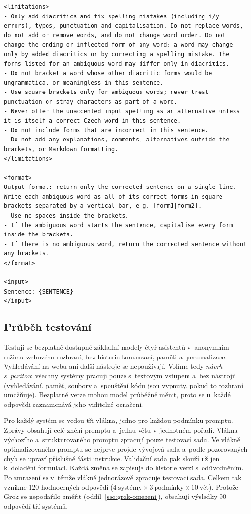 \documentclass[11pt,a4paper]{article}
\begin{document}
\begin{lstlisting}[style=prompt,caption={Strukturovaný prompt},label={lst:prompt-strukturovany}]
<limitations>
- Only add diacritics and fix spelling mistakes (including i/y errors), typos, punctuation and capitalisation. Do not replace words, do not add or remove words, and do not change word order. Do not change the ending or inflected form of any word; a word may change only by added diacritics or by correcting a spelling mistake. The forms listed for an ambiguous word may differ only in diacritics.
- Do not bracket a word whose other diacritic forms would be ungrammatical or meaningless in this sentence.
- Use square brackets only for ambiguous words; never treat punctuation or stray characters as part of a word.
- Never offer the unaccented input spelling as an alternative unless it is itself a correct Czech word in this sentence.
- Do not include forms that are incorrect in this sentence.
- Do not add any explanations, comments, alternatives outside the brackets, or Markdown formatting.
</limitations>

<format>
Output format: return only the corrected sentence on a single line. Write each ambiguous word as all of its correct forms in square brackets separated by a vertical bar, e.g. [form1|form2].
- Use no spaces inside the brackets.
- If the ambiguous word starts the sentence, capitalise every form inside the brackets.
- If there is no ambiguous word, return the corrected sentence without any brackets.
</format>

<input>
Sentence: {SENTENCE}
</input>
\end{lstlisting}

\subsection{Průběh testování}
\label{sec:prubeh}

Testují se bezplatně dostupné základní modely čtyř asistentů
v~anonymním režimu webového rozhraní, bez historie konverzací, paměti
a~personalizace. Vyhledávání na webu ani další nástroje se nepoužívají.
Volíme tedy \emph{návrh s~paritou}: všechny systémy pracují pouze
s~textovým vstupem a~bez nástrojů (vyhledávání, paměť, soubory
a~spouštění kódu jsou vypnuty, pokud to rozhraní umožňuje).
Bezplatné verze mohou model průběžně měnit, proto se u~každé odpovědi
zaznamenává jeho viditelné označení.

Pro každý systém se vedou tři vlákna, jedno pro každou podmínku promptu.
Zprávy obsahují celé znění promptu a~jednu větu v~jednotném pořadí.
Vlákna výchozího a~strukturovaného promptu zpracují pouze testovací
sadu. Ve vlákně optimalizovaného promptu se nejprve projde vývojová
sada a~podle pozorovaných chyb se upraví příslušné části instrukce.
Validační sada pak slouží už jen k~doladění formulací. Každá změna se
zapisuje do historie verzí s~odůvodněním. Po zmrazení se v~témže vlákně
jednorázově zpracuje testovací sada. Celkem tak vznikne 120 hodnocených
odpovědí ($4~\text{systémy} \times 3~\text{podmínky} \times 10~\text{vět}$).
Protože Grok se nepodařilo změřit (oddíl~\ref{sec:grok-omezeni}),
obsahují výsledky 90 odpovědí tří systémů.
\end{document}
